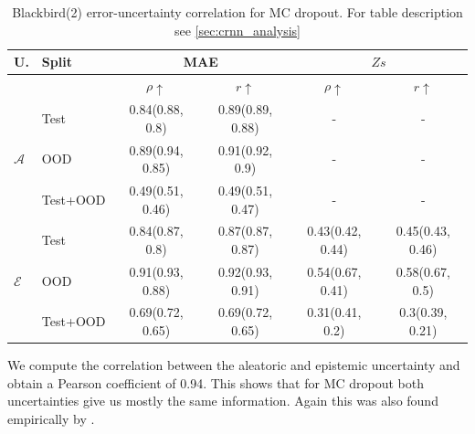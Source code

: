 \begin{table}[h]
\centering
    \begin{tabular}{l l c c c c}  
        \toprule
        U. & Split & \multicolumn{2}{c}{MAE} & \multicolumn{2}{c}{$Zs$}\\
        \midrule
        & & $\rho \uparrow$ & $r \uparrow$ & $\rho \uparrow$ & $r \uparrow$ \\
        \multirow{3}{*}{$\mathcal{A}$} 
            & Test     & 0.84(0.88, 0.8) & 0.89(0.89, 0.88) & - & - \\  
            & OOD      & 0.89(0.94, 0.85) & 0.91(0.92, 0.9) & - & - \\  
            & Test+OOD & 0.49(0.51, 0.46) & 0.49(0.51, 0.47) & - & - \\ 

        \midrule
        \multirow{3}{*}{$\mathcal{E}$} 
            & Test     & 0.84(0.87, 0.8)  & 0.87(0.87, 0.87) & 0.43(0.42, 0.44) & 0.45(0.43, 0.46) \\  
            & OOD      & 0.91(0.93, 0.88) & 0.92(0.93, 0.91) & 0.54(0.67, 0.41) & 0.58(0.67, 0.5) \\
            & Test+OOD & 0.69(0.72, 0.65) & 0.69(0.72, 0.65) & 0.31(0.41, 0.2) & 0.3(0.39, 0.21) \\ 

        \toprule
    \end{tabular}
    \caption[Blackbird(2) error-uncertainty correlation for MC dropout]{Blackbird(2) error-uncertainty correlation for MC dropout. For table description see \cref{sec:crnn_analysis}}
    \label{tbl:bb2_dropout_corr}
\end{table}

We compute the correlation between the aleatoric and epistemic uncertainty and obtain a Pearson coefficient of 0.94. This shows that for MC dropout both uncertainties give us mostly the same information. Again this was also found empirically by \cite{kendall2017uncertainties}. 

